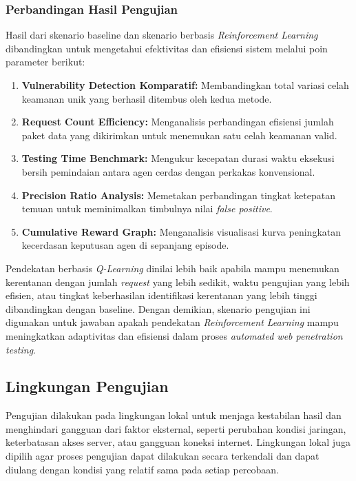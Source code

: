 \subsubsection{Perbandingan Hasil Pengujian}

Hasil dari skenario baseline dan skenario berbasis \textit{Reinforcement Learning} dibandingkan untuk mengetahui efektivitas dan efisiensi sistem melalui poin parameter berikut:

\begin{enumerate}
    \item \textbf{Vulnerability Detection Komparatif:} Membandingkan total variasi celah keamanan unik yang berhasil ditembus oleh kedua metode.
    \item \textbf{Request Count Efficiency:} Menganalisis perbandingan efisiensi jumlah paket data yang dikirimkan untuk menemukan satu celah keamanan valid.
    \item \textbf{Testing Time Benchmark:} Mengukur kecepatan durasi waktu eksekusi bersih pemindaian antara agen cerdas dengan perkakas konvensional.
    \item \textbf{Precision Ratio Analysis:} Memetakan perbandingan tingkat ketepatan temuan untuk meminimalkan timbulnya nilai \textit{false positive}.
    \item \textbf{Cumulative Reward Graph:} Menganalisis visualisasi kurva peningkatan kecerdasan keputusan agen di sepanjang episode.
\end{enumerate}

Pendekatan berbasis \textit{Q-Learning} dinilai lebih baik apabila mampu menemukan kerentanan dengan jumlah \textit{request} yang lebih sedikit, waktu pengujian yang lebih efisien, atau tingkat keberhasilan identifikasi kerentanan yang lebih tinggi dibandingkan dengan baseline. Dengan demikian, skenario pengujian ini digunakan untuk jawaban apakah pendekatan \textit{Reinforcement Learning} mampu meningkatkan adaptivitas dan efisiensi dalam proses \textit{automated web penetration testing}.

\subsection{Lingkungan Pengujian}

Pengujian dilakukan pada lingkungan lokal untuk menjaga kestabilan hasil dan menghindari gangguan dari faktor eksternal, seperti perubahan kondisi jaringan, keterbatasan akses server, atau gangguan koneksi internet. Lingkungan lokal juga dipilih agar proses pengujian dapat dilakukan secara terkendali dan dapat diulang dengan kondisi yang relatif sama pada setiap percobaan.


